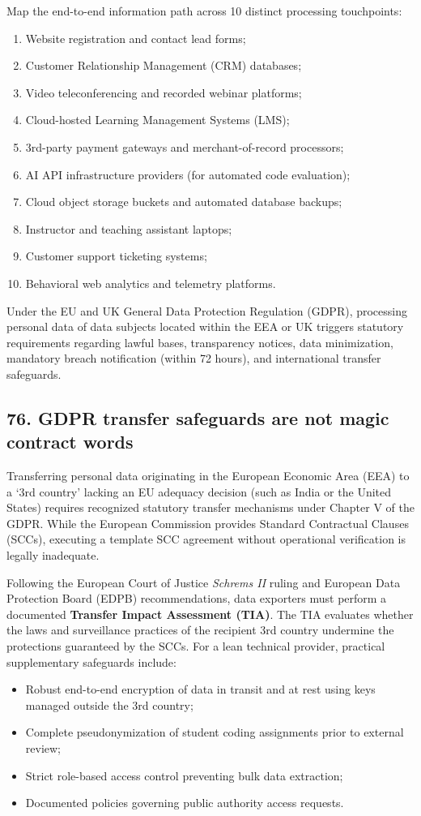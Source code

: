 Map the end-to-end information path across 10 distinct processing touchpoints:
\begin{enumerate}
    \item Website registration and contact lead forms;
    \item Customer Relationship Management (CRM) databases;
    \item Video teleconferencing and recorded webinar platforms;
    \item Cloud-hosted Learning Management Systems (LMS);
    \item 3rd-party payment gateways and merchant-of-record processors;
    \item AI API infrastructure providers (for automated code evaluation);
    \item Cloud object storage buckets and automated database backups;
    \item Instructor and teaching assistant laptops;
    \item Customer support ticketing systems;
    \item Behavioral web analytics and telemetry platforms.
\end{enumerate}
Under the EU and UK General Data Protection Regulation (GDPR), processing personal data of data subjects located within the EEA or UK triggers statutory requirements regarding lawful bases, transparency notices, data minimization, mandatory breach notification (within 72 hours), and international transfer safeguards.

\subsection{76. GDPR transfer safeguards are not magic contract words}

Transferring personal data originating in the European Economic Area (EEA) to a `3rd country' lacking an EU adequacy decision (such as India or the United States) requires recognized statutory transfer mechanisms under Chapter V of the GDPR. While the European Commission provides Standard Contractual Clauses (SCCs), executing a template SCC agreement without operational verification is legally inadequate.

Following the European Court of Justice \textit{Schrems II} ruling and European Data Protection Board (EDPB) recommendations, data exporters must perform a documented \textbf{Transfer Impact Assessment (TIA)}. The TIA evaluates whether the laws and surveillance practices of the recipient 3rd country undermine the protections guaranteed by the SCCs. For a lean technical provider, practical supplementary safeguards include:
\begin{itemize}
    \item Robust end-to-end encryption of data in transit and at rest using keys managed outside the 3rd country;
    \item Complete pseudonymization of student coding assignments prior to external review;
    \item Strict role-based access control preventing bulk data extraction;
    \item Documented policies governing public authority access requests.
\end{itemize}

